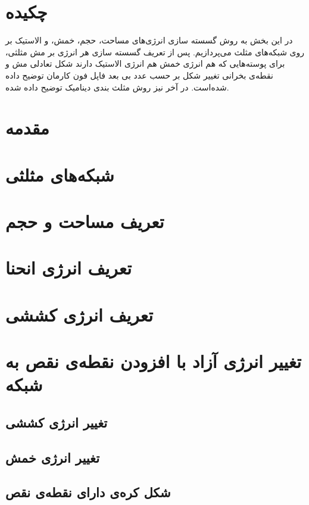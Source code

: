 \setRL
\clearpage
\def \MemDiscr {\Mempath /MembraneDiscrete}

\section{
چکیده
}
در این بخش به روش گسسته سازی انرژی‌های مساحت، حجم، خمش، و الاستیک بر روی شبکه‌های مثلث می‌پردازیم. پس از تعریف گسسته سازی هر انرژی بر مش مثلثی، برای پوسته‌هایی که هم انرژی خمش هم انرژی الاستیک دارند شکل تعادلی مش  و نقطه‌ی بخرانی تغییر شکل بر حسب عدد بی بعد فاپل فون کارمان توضیح داده شده‌است. در آخر نیز روش مثلث بندی دینامیک توضیح داده شده. 



\section{
مقدمه
}



\section{
شبکه‌های مثلثی
}



\section{
تعریف مساحت و حجم
\label{sec:areaVolumeDiscr}
}



\section{
تعریف انرژی انحنا
}



\section{
تعریف انرژی کششی
\label{sec:youngMesh}
}


\section{
تغییر انرژی آزاد با افزودن نقطەی نقص به شبکه
}
\subsection{
تغییر انرژی کششی
}

\subsection{
تغییر انرژی خمش
}

\subsection{
شکل کره‌ی دارای نقطه‌ی نقص
\label{sec:gammaTransition}
}


%




